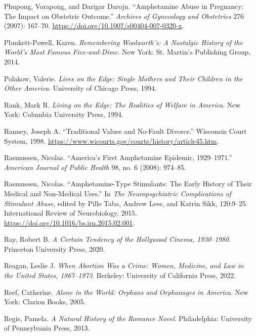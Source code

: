 \documentclass[
  letterpaper,
]{book}
\newlength{\cslhangindent}
\newenvironment{CSLReferences}[2] %
 {\begin{list}{}{%
  \setlength{\itemindent}{0pt}
  \setlength{\leftmargin}{0pt}
  \setlength{\parsep}{0pt}
  \ifodd #1
   \setlength{\leftmargin}{\cslhangindent}
   \setlength{\itemindent}{-1\cslhangindent}
  \fi
  \setlength{\itemsep}{#2\baselineskip}}}
 {\end{list}}
\begin{document}
\begin{CSLReferences}{1}{0}
Phupong, Vorapong, and Darigar Darojn. {``Amphetamine Abuse in
Pregnancy: The Impact on Obstetric Outcome.''} \emph{Archives of
Gynecology and Obstetrics} 276 (2007): 167--70.
\url{https://doi.org/10.1007/s00404-007-0320-x}.

Plunkett-Powell, Karen. \emph{Remembering Woolworth's: A Nostalgic
History of the World's Most Famous Five-and-Dime}. New York: St.
Martin's Publishing Group, 2014.

Polakow, Valerie. \emph{Lives on the Edge: Single Mothers and Their
Children in the Other America}. University of Chicago Press, 1994.

Rank, Mark R. \emph{Living on the Edge: The Realities of Welfare in
America}. New York: Columbia University Press, 1994.

Ranney, Joseph A. {``Traditional Values and No-Fault Divorce.''}
Wisconsin Court System, 1998.
\url{https://www.wicourts.gov/courts/history/article45.htm}.

Rasmussen, Nicolas. {``America's First Amphetamine Epidemic,
1929--1971.''} \emph{American Journal of Public Health} 98, no. 6
(2008): 974--85.

Rasmussen, Nicolas. {``Amphetamine-Type Stimulants: The Early History of
Their Medical and Non-Medical Uses.''} In \emph{The Neuropsychiatric
Complications of Stimulant Abuse}, edited by Pille Taba, Andrew Lees,
and Katrin Sikk, 120:9--25. International Review of Neurobiology, 2015.
\url{https://doi.org/10.1016/bs.irn.2015.02.001}.

Ray, Robert B. \emph{A Certain Tendency of the Hollywood Cinema,
1930--1980}. Princeton University Press, 2020.

Reagan, Leslie J. \emph{When Abortion Was a Crime: Women, Medicine, and
Law in the United States, 1867--1973}. Berkeley: University of
California Press, 2022.

Reef, Catherine. \emph{Alone in the World: Orphans and Orphanages in
America}. New York: Clarion Books, 2005.

Regis, Pamela. \emph{A Natural History of the Romance Novel}.
Philadelphia: University of Pennsylvania Press, 2013.


\end{CSLReferences}
\end{document}
